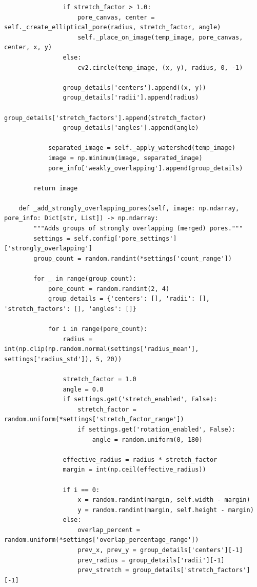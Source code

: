 \documentclass[code]{wordcore}
\begin{document}
\begin{code}
\begin{verbatim}
                if stretch_factor > 1.0:
                    pore_canvas, center = self._create_elliptical_pore(radius, stretch_factor, angle)
                    self._place_on_image(temp_image, pore_canvas, center, x, y)
                else:
                    cv2.circle(temp_image, (x, y), radius, 0, -1)

                group_details['centers'].append((x, y))
                group_details['radii'].append(radius)
                group_details['stretch_factors'].append(stretch_factor)
                group_details['angles'].append(angle)

            separated_image = self._apply_watershed(temp_image)
            image = np.minimum(image, separated_image)
            pore_info['weakly_overlapping'].append(group_details)

        return image

    def _add_strongly_overlapping_pores(self, image: np.ndarray, pore_info: Dict[str, List]) -> np.ndarray:
        """Adds groups of strongly overlapping (merged) pores."""
        settings = self.config['pore_settings']['strongly_overlapping']
        group_count = random.randint(*settings['count_range'])
        
        for _ in range(group_count):
            pore_count = random.randint(2, 4)
            group_details = {'centers': [], 'radii': [], 'stretch_factors': [], 'angles': []}

            for i in range(pore_count):
                radius = int(np.clip(np.random.normal(settings['radius_mean'], settings['radius_std']), 5, 20))

                stretch_factor = 1.0
                angle = 0.0
                if settings.get('stretch_enabled', False):
                    stretch_factor = random.uniform(*settings['stretch_factor_range'])
                    if settings.get('rotation_enabled', False):
                        angle = random.uniform(0, 180)

                effective_radius = radius * stretch_factor
                margin = int(np.ceil(effective_radius))

                if i == 0:
                    x = random.randint(margin, self.width - margin)
                    y = random.randint(margin, self.height - margin)
                else:
                    overlap_percent = random.uniform(*settings['overlap_percentage_range'])
                    prev_x, prev_y = group_details['centers'][-1]
                    prev_radius = group_details['radii'][-1]
                    prev_stretch = group_details['stretch_factors'][-1]


\end{verbatim}
\end{code}
\end{document}
